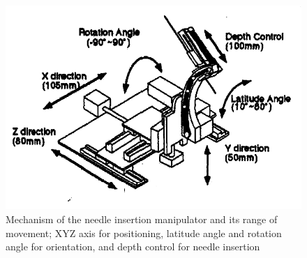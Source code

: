 \begin{figure}[h]
	\includegraphics[width=\textwidth]{images/robotic_stereotactic_frame.png}
	\caption[Masamune's stereotactic frame]{Mechanism of the needle insertion manipulator and its range of movement; XYZ axis for positioning, latitude angle and rotation angle for orientation, and depth control for needle insertion \cite{Masamune1995}}
	\label{fig:robotic_stereotactic_frame}
\end{figure}

